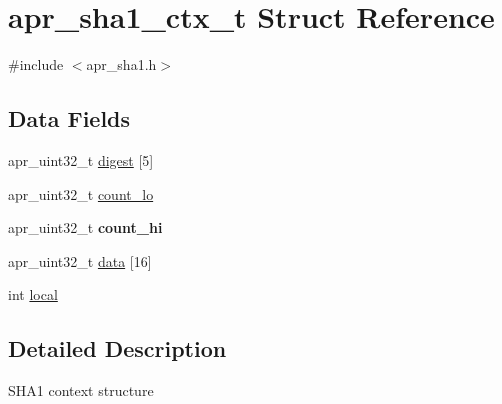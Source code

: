 \hypertarget{structapr__sha1__ctx__t}{\section{apr\-\_\-sha1\-\_\-ctx\-\_\-t Struct Reference}
\label{structapr__sha1__ctx__t}
}


{\ttfamily \#include $<$apr\-\_\-sha1.\-h$>$}

\subsection*{Data Fields}
\begin{DoxyCompactItemize}
\item 
apr\-\_\-uint32\-\_\-t \hyperlink{structapr__sha1__ctx__t_a152a127b59eb6e1cb686c2bbe00d51de}{digest} \mbox{[}5\mbox{]}
\item 
apr\-\_\-uint32\-\_\-t \hyperlink{structapr__sha1__ctx__t_ab105efa48b9318a419525e0f6076f6d2}{count\-\_\-lo}
\item 
\hypertarget{structapr__sha1__ctx__t_a32a4c5248869c36344cc7aac8b87f2d1}{apr\-\_\-uint32\-\_\-t {\bfseries count\-\_\-hi}}\label{structapr__sha1__ctx__t_a32a4c5248869c36344cc7aac8b87f2d1}

\item 
apr\-\_\-uint32\-\_\-t \hyperlink{structapr__sha1__ctx__t_af61fc6c30be244247e35e7c8b0b63407}{data} \mbox{[}16\mbox{]}
\item 
int \hyperlink{structapr__sha1__ctx__t_aaa8433058ac7a3b0649821cbab7de822}{local}
\end{DoxyCompactItemize}


\subsection{Detailed Description}
S\-H\-A1 context structure 

